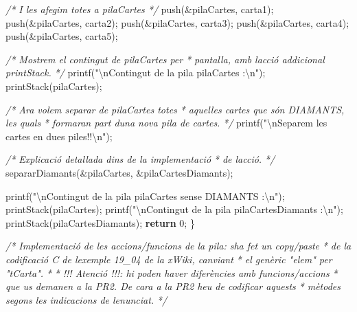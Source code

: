 \documentclass[
]{book}
\newenvironment{Shaded}{\begin{snugshade}}{\end{snugshade}}
\newcommand{\CommentTok}[1]{\textcolor[rgb]{0.56,0.35,0.01}{\textit{#1}}}
\newcommand{\ControlFlowTok}[1]{\textcolor[rgb]{0.13,0.29,0.53}{\textbf{#1}}}
\newcommand{\DecValTok}[1]{\textcolor[rgb]{0.00,0.00,0.81}{#1}}
\newcommand{\NormalTok}[1]{#1}
\newcommand{\SpecialCharTok}[1]{\textcolor[rgb]{0.00,0.00,0.00}{#1}}
\newcommand{\StringTok}[1]{\textcolor[rgb]{0.31,0.60,0.02}{#1}}
\begin{document}
\begin{Shaded}
\begin{Highlighting}[]
    \CommentTok{/* I les afegim totes a pilaCartes */}
\NormalTok{    push(\&pilaCartes, carta1);}
\NormalTok{    push(\&pilaCartes, carta2);}
\NormalTok{    push(\&pilaCartes, carta3);}
\NormalTok{    push(\&pilaCartes, carta4);}
\NormalTok{    push(\&pilaCartes, carta5);}
    
    \CommentTok{/* Mostrem el contingut de pilaCartes per}
\CommentTok{     * pantalla, amb l\textquotesingle{}acció addicional printStack. }
\CommentTok{     */}
\NormalTok{    printf(}\StringTok{"}\SpecialCharTok{\textbackslash{}n}\StringTok{Contingut de la pila \textquotesingle{}pilaCartes\textquotesingle{} :}\SpecialCharTok{\textbackslash{}n}\StringTok{"}\NormalTok{);}
\NormalTok{    printStack(pilaCartes);}
    
    \CommentTok{/* Ara volem separar de pilaCartes totes }
\CommentTok{     * aquelles cartes que són DIAMANTS, les quals}
\CommentTok{     * formaran part d\textquotesingle{}una nova pila de cartes. }
\CommentTok{     */}
\NormalTok{    printf(}\StringTok{"}\SpecialCharTok{\textbackslash{}n}\StringTok{Separem les cartes en dues piles!!}\SpecialCharTok{\textbackslash{}n}\StringTok{"}\NormalTok{);}
    
    \CommentTok{/* Explicació detallada dins de la implementació}
\CommentTok{     * de l\textquotesingle{}acció. }
\CommentTok{     */}
\NormalTok{    separarDiamants(\&pilaCartes, \&pilaCartesDiamants);}
    
\NormalTok{    printf(}\StringTok{"}\SpecialCharTok{\textbackslash{}n}\StringTok{Contingut de la pila \textquotesingle{}pilaCartes\textquotesingle{} sense DIAMANTS :}\SpecialCharTok{\textbackslash{}n}\StringTok{"}\NormalTok{);}
\NormalTok{    printStack(pilaCartes);}
\NormalTok{    printf(}\StringTok{"}\SpecialCharTok{\textbackslash{}n}\StringTok{Contingut de la pila \textquotesingle{}pilaCartesDiamants\textquotesingle{} :}\SpecialCharTok{\textbackslash{}n}\StringTok{"}\NormalTok{);}
\NormalTok{    printStack(pilaCartesDiamants);}
    \ControlFlowTok{return} \DecValTok{0}\NormalTok{;}
\NormalTok{\}}

\CommentTok{/* Implementació de les accions/funcions de la pila: s\textquotesingle{}ha fet un copy/paste}
\CommentTok{ * de la codificació C de l\textquotesingle{}exemple 19\_04 de la xWiki, canviant}
\CommentTok{ * el genèric "elem" per "tCarta". }
\CommentTok{ *}
\CommentTok{ * !!! Atenció !!!: hi poden haver diferències amb funcions/accions }
\CommentTok{ * que us demanen a la PR2. De cara a la PR2 heu de codificar aquests}
\CommentTok{ * mètodes segons les indicacions de l\textquotesingle{}enunciat. }
\CommentTok{ */}


\end{Highlighting}
\end{Shaded}
\end{document}
